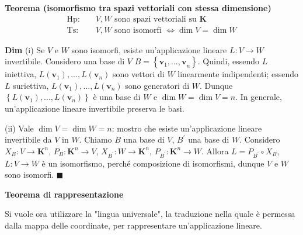 \documentclass{article}
\begin{document}
\textbf{Teorema (isomorfismo tra spazi vettoriali con stessa dimensione)}%
\begin{eqnarray*}
\text{Hp}\text{: } &&V,W\text{ sono spazi vettoriali su }\mathbf{K} \\
\text{Ts}\text{: } &&V,W\text{ sono isomorfi }\Longleftrightarrow \dim
V=\dim W
\end{eqnarray*}

\textbf{Dim} (i) Se $V$ e $W$ sono isomorfi, esiste un'applicazione lineare $%
L:V\rightarrow W$ invertibile. Considero una base di $V$ $B=\left\{ \mathbf{v%
}_{1}\mathbf{,...,v}_{n}\right\} $. Quindi, essendo $L$ iniettiva, $L\left( 
\mathbf{v}_{1}\right) ,...,L\left( \mathbf{v}_{n}\right) $ sono vettori di $%
W $ linearmente indipendenti; essendo $L$ suriettiva, $L\left( \mathbf{v}%
_{1}\right) ,...,L\left( \mathbf{v}_{n}\right) $ sono generatori di $W$.
Dunque $\left\{ L\left( \mathbf{v}_{1}\right) ,...,L\left( \mathbf{v}%
_{n}\right) \right\} $ \`{e} una base di $W$ e $\dim W=\dim V=n$. In
generale, un'applicazione lineare invertibile preserva le basi.

(ii) Vale $\dim V=\dim W=n$: mostro che esiste un'applicazione lineare
invertibile da $V$ in $W$. Chiamo $B$ una base di $V$, $B^{\prime }$ una
base di $W$. Considero $X_{B}:V\rightarrow \mathbf{K}^{n}$, $P_{B}:\mathbf{K}%
^{n}\rightarrow V$, $X_{B^{\prime }}:W\rightarrow \mathbf{K}^{n}$, $%
P_{B^{\prime }}:\mathbf{K}^{n}\rightarrow W$. Allora $L=P_{B^{\prime }}\circ
X_{B}$, $L:V\rightarrow W$ \`{e} un isomorfismo, perch\'{e} composizione di
isomorfismi, dunque $V$ e $W$ sono isomorfi. $\blacksquare $

\textbf{Teorema di rappresentazione}

Si vuole ora utilizzare la "lingua universale", la traduzione nella quale 
\`{e} permessa dalla mappa delle coordinate, per rappresentare
un'applicazione lineare.
\end{document}
